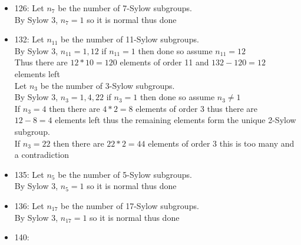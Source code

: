 \documentclass[12pt,letterpaper]{article}
\theoremstyle{definition}
\renewcommand{\t}[1]{\text{#1}}
\begin{document}
\begin{itemize}
    The compound homomorphism is not injective since $|G|>2$ so if the kernel is not the whole group then we are done since we have a normal subgroup.\\
    If the kernel is the whole group then we know that $G$ is isomorphic to a subgroup of $A_6$\\
    Thus consider the group action of $A_6$ on the left cosets of im$(G)$ by left multiplication\\
    Thus there is a homomorphism from  $A_6 \rightarrow S_3$ since $|\t{im}(G)|=120$ thus $[A_6 : \t{im}(G)]=3$\\
    Thus, since shown in class $A_6$ is simple we know that the kernel of this map is either $G$ or $\{e\}$. However, it cannot be the whole group since each coset is distinct and this would mean they are all the same.\\
    Thus the homomorphism is injective however this is a contradiction since $|A_6| > |S_3|$ thus this is not possible.
    \item 126:
    Let $n_{7}$ be the number of 7-Sylow subgroups.\\
    By Sylow 3, $n_{7}=1$ so it is normal thus done
    \item 132:
    Let $n_{11}$ be the number of 11-Sylow subgroups.\\
    By Sylow 3, $n_{11}=1,12$ if $n_{11}=1$ then done so assume $n_{11}=12$\\
    Thus there are $12*10=120$ elements of order 11 and $132-120=12$ elements left\\
    Let $n_3$ be the number of 3-Sylow subgroups.\\
    By Sylow 3, $n_3=1,4,22$ if $n_3=1$ then done so assume $n_3 \neq 1$\\
    If $n_3=4$ then there are $4*2=8$ elements of order 3 thus there are $12-8=4$ elements left thus the remaining elements form the unique 2-Sylow subgroup.\\
    If $n_3=22$ then there are $22*2=44$ elements of order 3 this is too many and a contradiction\\
    \item 135:
    Let $n_{5}$ be the number of 5-Sylow subgroups.\\
    By Sylow 3, $n_{5}=1$ so it is normal thus done
    \item 136:
    Let $n_{17}$ be the number of 17-Sylow subgroups.\\
    By Sylow 3, $n_{17}=1$ so it is normal thus done
    \item 140:

\end{itemize}
\end{document}
